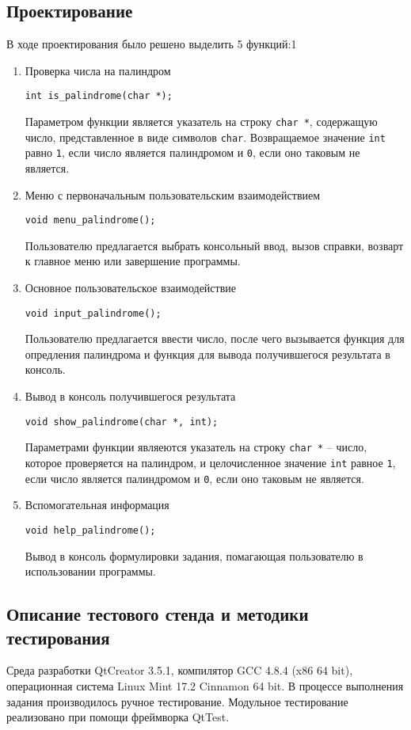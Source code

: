 \documentclass[12pt,a4paper]{report}
\begin{document}
\subsection{Проектирование}
\hspace{\parindent}В ходе проектирования было решено выделить 5 функций:1
\begin{enumerate}
 	\item Проверка числа на палиндром
 	
 	\verb+int is_palindrome(char *);+
 	
	Параметром функции является указатель на строку \verb+char *+, содержащую число, представленное в виде символов \verb+char+. Возвращаемое значение \verb+int+ равно \verb+1+, если число является палиндромом и \verb+0+, если оно таковым не является.	 
		 
		 
	\item Меню с первоначальным пользовательским взаимодействием
	
	\verb+void menu_palindrome();+
	
	Пользователю предлагается выбрать консольный ввод, вызов справки, возварт к главное меню или завершение программы.	
		 
		 
	\item Основное пользовательское взаимодействие
	
	\verb+void input_palindrome();+

	Пользователю предлагается ввести число, после чего вызывается функция для опредления палиндрома и функция для вывода получившегося результата в консоль.
	
	
	\item Вывод в консоль получившегося результата
	
	\verb+void show_palindrome(char *, int);+

Параметрами функции являеются указатель на строку \verb+char *+ -- число, которое проверяется на палиндром, и целочисленное значение \verb+int+ равное \verb+1+, если число является палиндромом и \verb+0+, если оно таковым не является.	 
	
	
	\item Вспомогательная информация
	
	\verb+void help_palindrome();+
	
	Вывод в консоль формулировки задания, помагающая пользователю в использовании программы.
\end{enumerate}

\subsection{Описание тестового стенда и методики тестирования}
\hspace{\parindent}Среда разработки QtCreator 3.5.1, компилятор GCC 4.8.4 (x86 64 bit), операционная система Linux Mint 17.2 Cinnamon 64 bit.
В процессе выполнения задания производилось ручное тестирование.
Модульное тестирование реализовано при помощи фреймворка QtTest.
\end{document}
